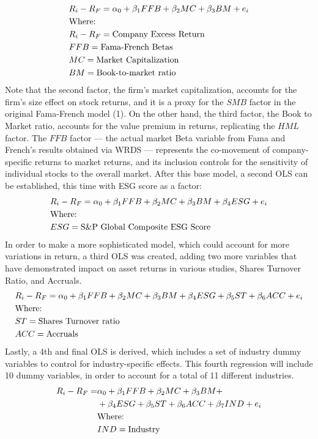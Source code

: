 \documentclass[man,natbib,floatsintext]{apa6}
\begin{document}
\begin{align}
&R_i-R_F =\alpha_0+\beta_1 FFB +\beta_2 MC + \beta_3 BM + e_i \\
&  \text{Where: } \notag\\
& R_i-R_F = \text{Company Excess Return}\notag \\ 
&  FFB = \text{Fama-French Betas} \notag \\
&  MC = \text{Market Capitalization} \notag \\
&  BM= \text{Book-to-market ratio} \notag 
\end{align}
Note that the second factor, the firm’s market capitalization, accounts for the firm's size effect on stock returns, and it is a proxy for the $SMB$ factor in the original Fama-French model (1). On the other hand, the third factor, the Book to Market ratio, accounts for the value premium in returns, replicating the $HML$ factor. The $FFB$ factor --- the actual market Beta variable from Fama and French’s results obtained via WRDS --- represents the co-movement of company-specific returns to market returns, and its inclusion controls for the sensitivity of individual stocks to the overall market. 
After this base model, a second OLS can be established, this time with ESG score as a factor:
\begin{align}
&R_i-R_F =\alpha_0+\beta_1 FFB +\beta_2 MC + \beta_3 BM +\beta_4 ESG + e_i \\
&  \text{Where: } \notag\\
&  ESG = \text{S\&P Global Composite ESG Score} \notag 
\end{align}
In order to make a more sophisticated model, which could account for more variations in return, a third OLS was created, adding two more variables that have demonstrated impact on asset returns in various studies, Shares Turnover Ratio, and Accruals.
\begin{align}
&R_i-R_F =\alpha_0+\beta_1 FFB +\beta_2 MC +\beta_3 BM + \beta_4 ESG +\beta_5 ST + \beta_6 ACC + e_i \\
&  \text{Where: } \notag\\
&  ST= \text{Shares Turnover ratio } \notag \\ 
&  ACC = \text{Accruals} \notag 
\end{align}
Lastly, a 4th and final OLS is derived, which includes a set of industry dummy variables to control for industry-specific effects. This fourth regression will include 10 dummy variables, in order to account for a total of 11 different industries.
\begin{align}
R_i-R_F =&\alpha_0+\beta_1 FFB +\beta_2 MC +\beta_3 BM + \\
          &+\beta_4 ESG +\beta_5 ST + \beta_6 ACC +\beta_7 IND + e_i\notag \\
  &\text{Where: } \notag\\
  &IND= \text{Industry} \notag 
\end{align}
\end{document}
